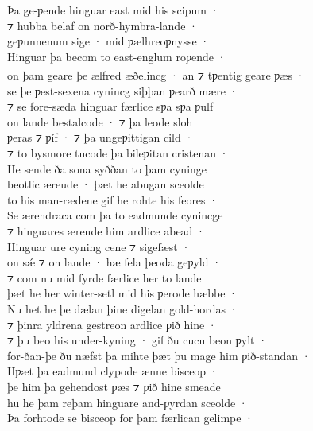 \documentclass[10pt]{book}
\begin{document}
\begin{center}
\parbox{\pagelen}{
Þa ge-ƿende hinguar east mid his scipum · \\
⁊ hubba belaf on norð-hymbra-lande · \\
geƿunnenum sige · mid ƿ\ae{}lhreoƿnysse · \\
Hinguar þa becom to east-englum roƿende · \\
on þam geare þe \ae{}lfred \ae{}ðelincg\textsuperscript{\textdagger} · an ⁊ tƿentig geare ƿ\ae{}s · \\
se þe ƿest-sexena cynincg siþþan ƿearð m\ae{}re · \\
⁊ se fore-s\ae{}da hinguar f\ae{}rlice sƿa sƿa ƿulf \\
on lande bestalcode · ⁊ þa leode sloh \\
ƿeras ⁊ ƿ\'if · ⁊ þa ungeƿittigan cild · \\
⁊ to bysmore tucode þa bileƿitan cristenan · \\
He sende ða sona syððan to þam cyninge \\
beotlic \ae{}reude · þ\ae{}t he abugan sceolde \\
to his man-r\ae{}dene gif he rohte his feores · \\
Se \ae{}rendraca com þa to eadmunde cynincge \\
⁊ hinguares \ae{}rende him ardlice abead · \\
Hinguar ure cyning cene ⁊ sigef\ae{}st · \\
on s\'\ae{} ⁊ on lande · h\ae{} fela þeoda geƿyld · \\
⁊ com nu mid fyrde f\ae{}rlice her to lande \\
þ\ae{}t he her winter-setl mid his ƿerode h\ae{}bbe · \\
Nu het he þe d\ae{}lan þine digelan gold-hordas · \\
⁊ þinra yldrena gestreon ardlice ƿið hine · \\
⁊ þu beo his under-kyning · gif ðu cucu beon ƿylt · \\
for-ðan-þe ðu n\ae{}fst þa mihte þ\ae{}t þu mage him ƿið-standan · \\
Hƿ\ae{}t þa eadmund clypode \ae{}nne bisceop · \\
þe him þa gehendost ƿ\ae{}s ⁊ ƿið hine smeade \\
hu he þam reþam hinguare and-ƿyrdan sceolde · \\
Þa forhtode se bisceop for þam f\ae{}rlican gelimpe · \\
}
\end{center}
\end{document}

